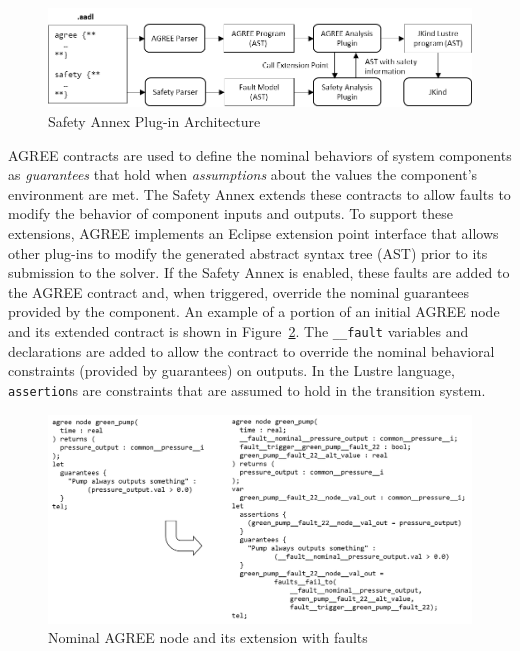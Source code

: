 \begin{figure}
	\begin{center}
		\includegraphics[width=.9\textwidth]{images/arch.png}
	\end{center}
	\vspace{-0.2in}
	\caption{Safety Annex Plug-in Architecture}
	\label{fig:plugin-arch}
\end{figure}

AGREE contracts are used to define the nominal behaviors of system components as {\em guarantees} that hold when {\em assumptions} about the values the component's environment are met.  The Safety Annex extends these contracts to allow faults to modify the behavior of component inputs and outputs.  To support these extensions, AGREE implements an Eclipse extension point interface that allows other plug-ins to modify the generated abstract syntax tree (AST) prior to its submission to the solver.  If the Safety Annex is enabled, these faults are added to the AGREE contract and, when triggered, override the nominal guarantees provided by the component.  An example of a portion of an initial AGREE node and its extended contract is shown in Figure~\ref{fig:comp}.  The \texttt{\_\_fault} variables and declarations are added to allow the contract to override the nominal behavioral constraints (provided by guarantees) on outputs.  In the Lustre language, \texttt{assertion}s are constraints that are assumed to hold in the transition system.

\begin{figure}
	\vspace{-0.1in}
	\includegraphics[width=\textwidth]{images/sample_code.png}
	\vspace{-0.3in}
	\caption{Nominal AGREE node and its extension with faults}
	\label{fig:comp}
\end{figure}

